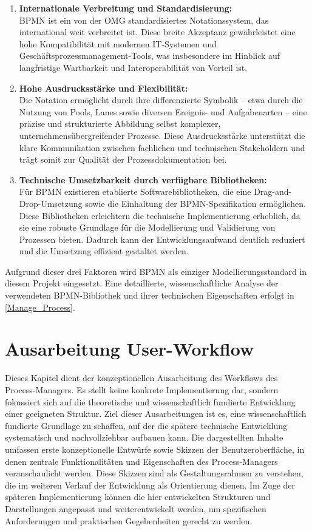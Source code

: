 \begin{enumerate}
    \item \textbf{Internationale Verbreitung und Standardisierung:} \\
    \ac{BPMN} ist ein von der \ac{OMG} standardisiertes Notationssystem, das international weit verbreitet ist. Diese breite Akzeptanz gewährleistet eine hohe Kompatibilität mit modernen \ac{IT}-Systemen und Geschäftsprozessmanagement-Tools, was insbesondere im Hinblick auf langfristige Wartbarkeit und Interoperabilität von Vorteil ist. \cite[Vgl.][]{OMG} \cite[Vgl.][]{Lindenbach} 
    \item \textbf{Hohe Ausdrucksstärke und Flexibilität:} \\
    Die Notation ermöglicht durch ihre differenzierte Symbolik -- etwa durch die Nutzung von Pools, Lanes sowie diversen Ereignis- und Aufgabenarten -- eine präzise und strukturierte Abbildung selbst komplexer, unternehmensübergreifender Prozesse. Diese Ausdrucksstärke unterstützt die klare Kommunikation zwischen fachlichen und technischen Stakeholdern und trägt somit zur Qualität der Prozessdokumentation bei. \cite[Vgl.][]{OMG} \cite[Vgl.][]{Lindenbach} 
    \item \textbf{Technische Umsetzbarkeit durch verfügbare Bibliotheken:} \\
    Für \ac{BPMN} existieren etablierte Softwarebibliotheken, die eine Drag-and-Drop-Umsetzung sowie die Einhaltung der BPMN-Spezifikation ermöglichen. Diese Bibliotheken erleichtern die technische Implementierung erheblich, da sie eine robuste Grundlage für die Modellierung und Validierung von Prozessen bieten. Dadurch kann der Entwicklungsaufwand deutlich reduziert und die Umsetzung effizient gestaltet werden.
\end{enumerate}
 
Aufgrund dieser drei Faktoren wird \ac{BPMN} als einziger Modellierungsstandard in diesem Projekt eingesetzt. Eine detaillierte, wissenschaftliche Analyse der verwendeten BPMN-Bibliothek und ihrer technischen Eigenschaften erfolgt in \autoref{Manage_Process}.


\newpage
\section{Ausarbeitung User-Workflow}
Dieses Kapitel dient der konzeptionellen Ausarbeitung des Workflows des Process-Managers. Es stellt keine konkrete Implementierung dar, sondern fokussiert sich auf die theoretische und wissenschaftlich fundierte Entwicklung einer geeigneten Struktur. Ziel dieser Ausarbeitungen ist es, eine wissenschaftlich fundierte Grundlage zu schaffen, auf der die spätere technische Entwicklung systematisch und nachvollziehbar aufbauen kann.
Die dargestellten Inhalte umfassen erste konzeptionelle Entwürfe sowie Skizzen der Benutzeroberfläche, in denen zentrale Funktionalitäten und Eigenschaften des Process-Managers veranschaulicht werden. Diese Skizzen sind als Gestaltungsrahmen zu verstehen, die im weiteren Verlauf der Entwicklung als Orientierung dienen.
Im Zuge der späteren Implementierung können die hier entwickelten Strukturen und Darstellungen angepasst und weiterentwickelt werden, um spezifischen Anforderungen und praktischen Gegebenheiten gerecht zu werden.
